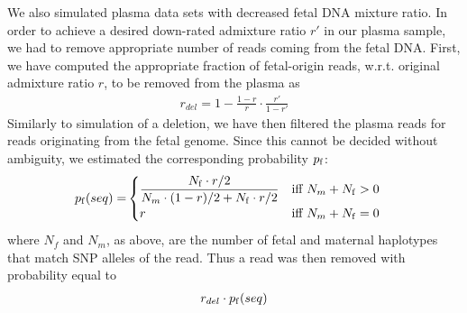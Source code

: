 	We also simulated plasma data sets with decreased fetal DNA mixture ratio. In order to achieve a desired down-rated admixture ratio $r'$ in our plasma sample, we had to remove appropriate number of reads coming from the fetal DNA. First, we have computed the appropriate fraction of fetal-origin reads, w.r.t. original admixture ratio $r$, to be removed from the plasma as
\begin{align}
r_{del} = 1 - \frac{1-r}{r} \cdot \frac{r'}{1-r'}
\end{align}
Similarly to simulation of a deletion, we have then filtered the plasma reads for reads originating from the fetal genome. Since this cannot be decided without ambiguity, we estimated the corresponding probability $p_{\mathrm{f}}$:
\begin{align*}
p_\f(seq) =& 
  \begin{cases}
    \mathlarger{\frac{ N_\f \cdot r/2 }{ N_m \cdot (1-r)/2 + N_\f \cdot r/2}} & \text{iff } N_m+N_\f>0 \\
    r & \text{iff } N_m+N_\f=0
  \end{cases}
\end{align*}
where $N_f$ and $N_m$, as above, are the number of fetal and maternal haplotypes that match SNP alleles of the read. Thus a read was then removed with probability equal to
\begin{align}
r_{del} \cdot p_{\mathrm{f}}(seq)
\end{align}
